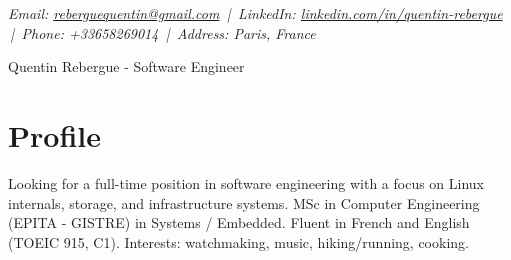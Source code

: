 \documentclass[9pt,a4paper]{article}
\newcommand{\namefont}{\fontsize{18}{22}\selectfont}
\newcommand{\tinyscript}{\fontsize{8}{8}\selectfont}
\begin{document}
\renewcommand\normalsize{\fontsize{10.5}{15}\selectfont}
\normalsize

\begin{center}
  {\tinyscript\itshape
  Email: \href{mailto:reberguequentin@gmail.com}{reberguequentin@gmail.com} \,|\,
  LinkedIn: \href{https://linkedin.com/in/quentin-rebergue}{linkedin.com/in/quentin-rebergue} \,|\,
  Phone: +33658269014 \,|\,
  Address: Paris, France}
\end{center}

\begin{center}
  {\namefont Quentin Rebergue - Software Engineer}
\end{center}

\section*{Profile}
\begin{tcolorbox}[mybox2]
Looking for a full-time position in software engineering with a focus on Linux internals, storage, and infrastructure systems. MSc in Computer Engineering (EPITA - GISTRE) in Systems / Embedded. Fluent in French and English (TOEIC 915, C1). Interests: watchmaking, music, hiking/running, cooking.
\end{tcolorbox}
\end{document}
